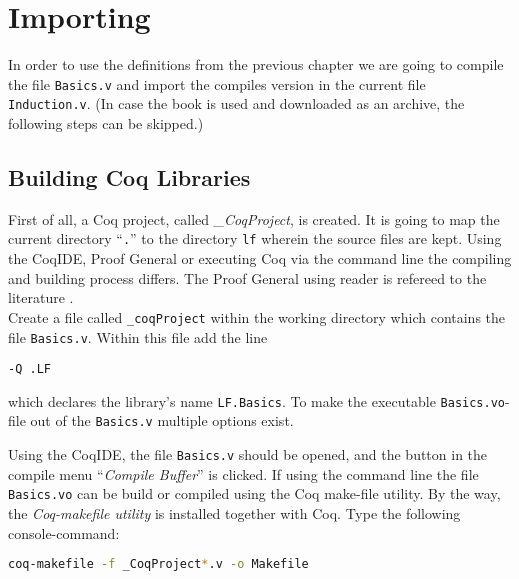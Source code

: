 \section{Importing}


In order to use the definitions from the previous chapter we are going to compile the file 
\texttt{Basics.v} and import the compiles version in the current file \texttt{Induction.v}.
(In case the book \cite{PACGGHSY} is used and downloaded as an archive, the following steps can be skipped.)   

\subsection{Building Coq Libraries}

First of all, a Coq project, called {\itshape \_CoqProject}, is created.  
It is going to map the current directory ``\texttt{.}'' to the directory \texttt{lf} wherein the source files are kept.
Using the CoqIDE, Proof General or executing Coq via the command line the compiling and building process differs.
The Proof General using reader is refereed to the literature \cite[Section, Induction, Proof by Induction]{PACGGHSY}.\\

Create a file called \texttt{\_coqProject} within the working directory which contains the file \texttt{Basics.v}.
Within this file add the line 

\begin{lstlisting}[caption = \lstinline!naming a library!]
-Q .LF
\end{lstlisting}

which declares the library's name \texttt{LF.Basics}. 
To make the executable \texttt{Basics.vo}-file out of the \texttt{Basics.v} multiple options exist.

Using the CoqIDE, the file \texttt{Basics.v} should be opened, and the button in the compile menu  ``{\itshape Compile Buffer}'' is clicked.
If using the command line the file \texttt{Basics.vo} can be build or compiled using the Coq  make-file utility.
By the way, the {\itshape Coq-makefile utility } is installed together with Coq.
Type the following console-command:
\begin{lstlisting}[language=bash, caption = \lstinline!coq-makefile!, label = lst:coq-makefile]
coq-makefile -f _CoqProject*.v -o Makefile
\end{lstlisting}

